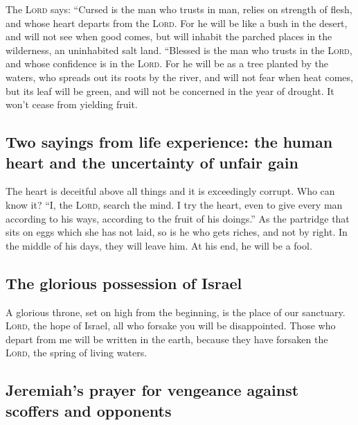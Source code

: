 The \textsc{Lord} says: ``Cursed is the man who trusts in
man, relies on strength of flesh, and whose heart departs from the
\textsc{Lord}.  For he will be like a bush in the desert,
and will not see when good comes, but will inhabit the parched places in
the wilderness, an uninhabited salt land.  ``Blessed is
the man who trusts in the \textsc{Lord}, and whose confidence is in the
\textsc{Lord}.  For he will be as a tree planted by the
waters, who spreads out its roots by the river, and will not fear when
heat comes, but its leaf will be green, and will not be concerned in the
year of drought. It won't cease from yielding fruit.

\hypertarget{two-sayings-from-life-experience-the-human-heart-and-the-uncertainty-of-unfair-gain}{%
\subsection{Two sayings from life experience: the human heart and the
uncertainty of unfair
gain}\label{two-sayings-from-life-experience-the-human-heart-and-the-uncertainty-of-unfair-gain}}

 The heart is deceitful above all things and it is
exceedingly corrupt. Who can know it?  ``I, the
\textsc{Lord}, search the mind. I try the heart, even to give every man
according to his ways, according to the fruit of his doings.''
 As the partridge that sits on eggs which she has not
laid, so is he who gets riches, and not by right. In the middle of his
days, they will leave him. At his end, he will be a fool.

\hypertarget{the-glorious-possession-of-israel}{%
\subsection{The glorious possession of
Israel}\label{the-glorious-possession-of-israel}}

 A glorious throne, set on high from the beginning, is
the place of our sanctuary.  \textsc{Lord}, the hope of
Israel, all who forsake you will be disappointed. Those who depart from
me will be written in the earth, because they have forsaken the
\textsc{Lord}, the spring of living waters.

\hypertarget{jeremiahs-prayer-for-vengeance-against-scoffers-and-opponents}{%
\subsection{Jeremiah's prayer for vengeance against scoffers and
opponents}\label{jeremiahs-prayer-for-vengeance-against-scoffers-and-opponents}}


